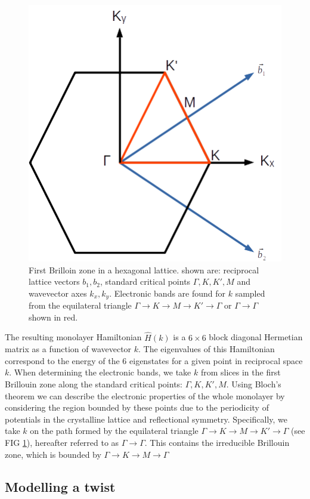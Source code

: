 \documentclass[12pt]{report} %
\begin{document}
\begin{figure}[t]
\centering
\includegraphics[width=0.6\columnwidth]{1st_BZ.png}
  \caption{
    First Brilloin zone in a hexagonal lattice. shown are: reciprocal lattice vectors $b_1, b_2$, standard critical points $\Gamma, K, K', M$ and wavevector axes $k_x, k_y$. Electronic bands are found for $k$ sampled from the equilateral triangle $\Gamma \rightarrow K \rightarrow M \rightarrow K' \rightarrow \Gamma$ or $\Gamma \rightarrow \Gamma$ shown in red.
  }
  \label{1st_BZ_diagram}
\end{figure}

  The resulting monolayer Hamiltonian $\hat{H}(k)$ is a $6\times6$ block diagonal Hermetian matrix as a function of wavevector $k$. The eigenvalues of this Hamiltonian correspond to the energy of the 6 eigenstates for a given point in reciprocal space $k$. When determining the electronic bands, we take $k$ from slices in the first Brillouin zone along the standard critical points: $\Gamma, K, K', M$. Using Bloch's theorem we can describe the electronic properties of the whole monolayer by considering the region bounded by these points due to the periodicity of potentials in the crystalline lattice and reflectional symmetry. Specifically, we take $k$ on the path formed by the equilateral triangle $\Gamma \rightarrow K \rightarrow M \rightarrow K' \rightarrow \Gamma$ (see FIG \ref{1st_BZ_diagram}), hereafter referred to as $\Gamma \rightarrow \Gamma$. This contains the irreducible Brillouin zone, which is bounded by $\Gamma \rightarrow K \rightarrow M \rightarrow \Gamma$

\subsection*{Modelling a twist}
\end{document}
